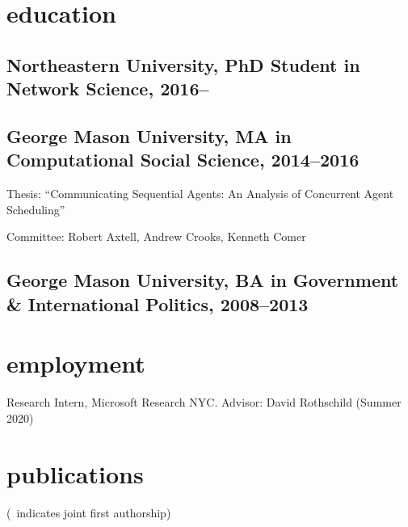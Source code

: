 \documentclass[11pt, letter]{article}
\title{}
\begin{document}
\maketitle

\section{education}
\subsection{Northeastern University, PhD Student in Network Science, 2016--}
\subsection{George Mason University, MA in Computational Social Science,
  2014--2016}
Thesis: ``Communicating Sequential Agents: An Analysis of Concurrent Agent
Scheduling''

Committee: Robert Axtell, Andrew Crooks, Kenneth Comer
\subsection{George Mason University, BA in Government \& International Politics,
  2008--2013}

\vspace{2mm}

\section{employment}
Research Intern, Microsoft Research NYC. Advisor: David Rothschild (Summer 2020)
\vspace{-1mm}
\section{publications}
\vspace{1mm} {\footnotesize (\textdagger\, indicates joint first authorship)}
\subsection*{} %
\end{document}
